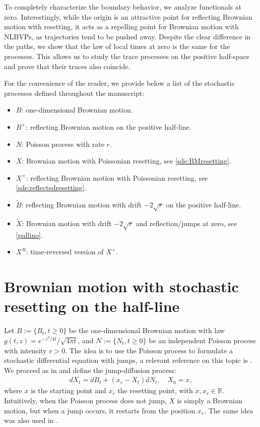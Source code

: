 \documentclass[11pt,a4paper]{article}
\theoremstyle{definition}
\theoremstyle{remark}
\begin{document}
To completely characterize the boundary behavior, we analyze functionals at zero. Interestingly, while the origin is an attractive point for reflecting Brownian motion with resetting, it acts as a repelling point for Brownian motion with NLBVPs, as trajectories tend to be pushed away. Despite the clear difference in the paths, we show that the law of local times at zero is the same for the processes. This allows us to study the trace processes on the positive half-space and prove that their traces also coincide.


For the convenience of the reader, we provide below a list of the stochastic processes defined throughout the manuscript:

\begin{itemize}
	\item[-] $B$: one-dimensional Brownian motion.
	\item[-] $B^+$: reflecting Brownian motion on the positive half-line.
	\item[-] $N$: Poisson process with rate $r$.
	\item[-] $X$: Brownian motion with Poissonian resetting, see \eqref{sde:BMresetting}.
	\item[-] $X^+$: reflecting Brownian motion with Poissonian resetting, see \eqref{sde:reflectedresetting}.
	\item[-] $\widetilde{B}$: reflecting Brownian motion with drift $-2\sqrt{r}$ on the positive half-line.
	\item[-] $\widetilde{X}$: Brownian motion with drift $-2\sqrt{r}$ and reflection/jumps at zero, see \eqref{pallino}.
	\item[-] $X^R$: time-reversed version of $X^+$.
\end{itemize}


\section{Brownian motion with stochastic resetting on the half-line}
\label{sec:bmrestting}
Let \( B := \{B_t, t \geq 0 \} \) be the one-dimensional Brownian motion with law \( g(t, z) = e^{-z^2/ 4t}/\sqrt{4 \pi t} \), and \( N := \{N_t, t \geq 0 \} \) be an independent Poisson process with intensity \( r>0 \). The idea is to use the Poisson process to formulate a stochastic differential equation with jumps, a relevant reference on this topic is \cite{bass-sde-jumps}. We proceed as in \cite[Formula (4)]{sde-resetting} and define the jump-diffusion process:
\begin{align}
	\label{sde:BMresetting}
	dX_t = dB_t + (x_r - X_t) dN_t , \quad X_0 = x,
\end{align}
where \( x \) is the starting point and \( x_r \) the resetting point, with \( x, x_r \in \mathbb{R} \). Intuitively, when the Poisson process does not jump, \( X \) is simply a Brownian motion, but when a jump occurs, it restarts from the position \( x_r \). The same idea was also used in \cite{pal2017integral}.
\end{document}
